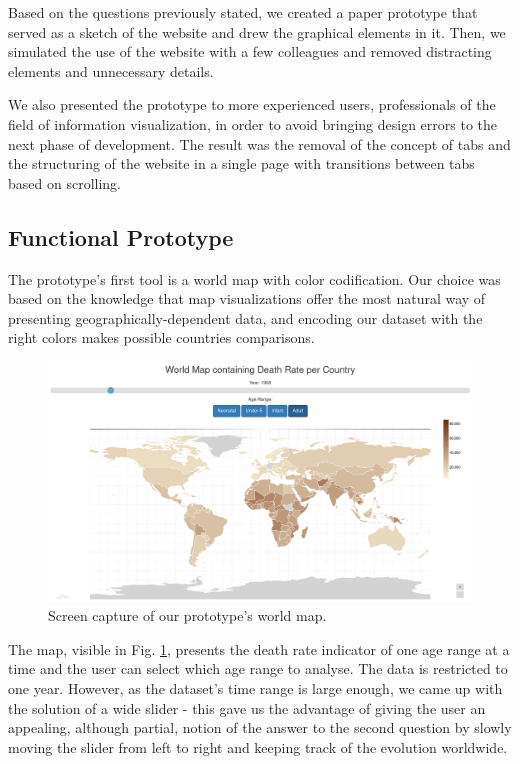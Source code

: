 \documentclass[conference]{IEEEtran}
\begin{document}
Based on the questions previously stated, we created a paper prototype that 
served as a sketch of the website and drew the graphical elements in it.
Then, we simulated the use of the website with a few colleagues and removed 
distracting elements and unnecessary details.

We also presented the prototype to more experienced users, professionals of the
field of information visualization, in order to avoid bringing design errors to
the next phase of development.
The result was the removal of the concept of tabs and the structuring of the 
website in a single page with transitions between tabs based on scrolling.

\subsection{Functional Prototype}

The prototype's first tool is a world map with color codification.
Our choice was based on the knowledge that map visualizations offer the most 
natural way of presenting geographically-dependent data, and encoding our 
dataset with the right colors makes possible countries comparisons.

\begin{figure}[h!]
\centering
\includegraphics[width=0.95\linewidth]{../img/screenshots/screenshot_map.png}
\caption{Screen capture of our prototype's world map.}
\label{fig:worldmap}
\end{figure}

The map, visible in Fig. \ref{fig:worldmap}, presents the death rate indicator of one 
age range at a time and the user can select which age range to analyse.
The data is restricted to one year.
However, as the dataset's time range is large enough, we came up with the 
solution of a wide slider - this gave us the advantage of giving the user an 
appealing, although partial, notion of the answer to the second question by 
slowly moving the slider from left to right and keeping track of the evolution 
worldwide.
\end{document}
